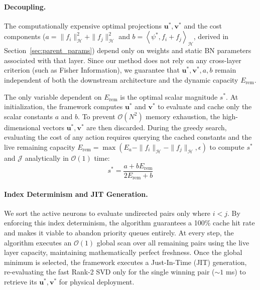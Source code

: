 \documentclass[11pt, a4paper, copyright, gdm]{google}
\newcommand{\inner}[2]{\left\langle#1, #2\right\rangle}
\newcommand{\uVect}{\boldsymbol{u}}
\newcommand{\vVect}{\boldsymbol{v}}
\newcommand{\calH}{\mathcal{H}}
\newcommand{\calJ}{\mathcal{J}}
\newcommand{\calO}{\mathcal{O}}
\theoremstyle{definition}
\begin{document}
\paragraph{Decoupling.}
The computationally expensive optimal projections $\uVect^*, \vVect^*$ and the cost components ($a = \|f_i\|_{\calH}^2 + \|f_j\|_{\calH}^2$ and $b = \inner{\psi^*}{f_i+f_j}_{\calH}$, derived in Section~\ref{sec:parent_params}) depend only on weights and static BN parameters associated with that layer. Since our method does not rely on any cross-layer criterion (such as Fisher Information), we guarantee that $\uVect^*, \vVect^*, a, b$ remain independent of both the downstream architecture and the dynamic capacity $E_{\text{rem}}$. 

The only variable dependent on $E_{\text{rem}}$ is the optimal scalar magnitude $s^*$. At initialization, the framework computes $\uVect^*$ and $\vVect^*$ to evaluate and cache only the scalar constants $a$ and $b$. To prevent $\calO(N^2)$ memory exhaustion, the high-dimensional vectors $\uVect^*,\vVect^*$ are then discarded. During the greedy search, evaluating the cost of any action requires querying the cached constants and the live remaining capacity $E_{\text{rem}} = \max(E_a - \|f_i\|_{\calH} - \|f_j\|_{\calH}, \epsilon)$ to compute $s^*$ and $\calJ$ analytically in $\calO(1)$ time:
\begin{equation}
    s^* = \frac{a + b E_{\text{rem}}}{2 E_{\text{rem}} + b}
\end{equation}

\paragraph{Index Determinism and JIT Generation.}
We sort the active neurons to evaluate undirected pairs only where $i < j$. By enforcing this index determinism, the algorithm guarantees a 100\% cache hit rate and makes it viable to abandon priority queues entirely. At every step, the algorithm executes an $\calO(1)$ global scan over all remaining pairs using the live layer capacity, maintaining mathematically perfect freshness. Once the global minimum is selected, the framework executes a Just-In-Time (JIT) generation, re-evaluating the fast Rank-2 SVD only for the single winning pair ($\sim 1$ ms) to retrieve its $\uVect^*,\vVect^*$ for physical deployment.
\end{document}
